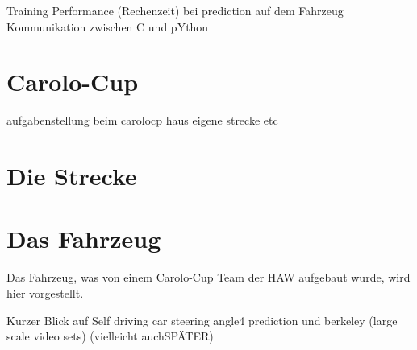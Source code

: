 Training 
Performance (Rechenzeit) bei prediction auf dem Fahrzeug
Kommunikation zwischen C und pYthon


\section{Carolo-Cup}
aufgabenstellung beim carolocp
haus eigene strecke etc

\section{Die Strecke}

\section{Das Fahrzeug}
Das Fahrzeug, was von einem Carolo-Cup Team der HAW aufgebaut wurde, wird hier vorgestellt.





Kurzer Blick auf  Self driving car steering angle4 prediction und berkeley (large scale video sets) (vielleicht auchSPÄTER)

